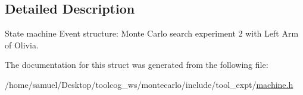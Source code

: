 \subsection{Detailed Description}
State machine Event structure\+: Monte Carlo search experiment 2 with Left Arm of Olivia. 

The documentation for this struct was generated from the following file\+:\begin{DoxyCompactItemize}
\item 
/home/samuel/\+Desktop/toolcog\+\_\+ws/montecarlo/include/tool\+\_\+expt/\hyperlink{machine_8h}{machine.\+h}\end{DoxyCompactItemize}
